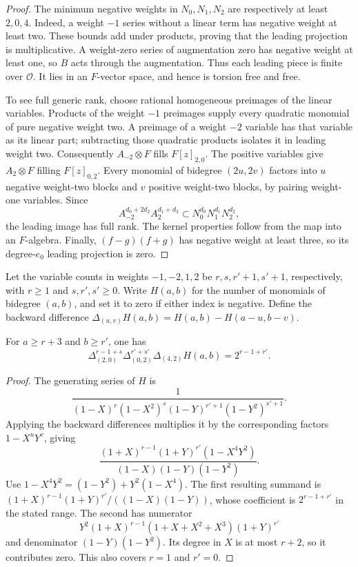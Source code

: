 \begin{proof}
The minimum negative weights in $N_0,N_1,N_2$ are respectively at least
$2,0,4$. Indeed, a weight $-1$ series without a linear term has negative
weight at least two. These bounds add under products, proving that the
leading projection is multiplicative. A weight-zero series of
augmentation zero has negative weight at least one, so $B$ acts through
the augmentation. Thus each leading piece is finite over $\mathcal O$.
It lies in an $F$-vector space, and hence is torsion free and free.

To see full generic rank, choose rational homogeneous preimages of the
linear variables. Products of the weight $-1$ preimages supply every
quadratic monomial of pure negative weight two. A preimage of a weight
$-2$ variable has that variable as its linear part; subtracting those
quadratic products isolates it in leading weight two. Consequently
$A_{-2}\otimes F$ fills $F[z]_{2,0}$. The positive variables give
$A_2\otimes F$ filling $F[z]_{0,2}$. Every monomial of bidegree $(2u,2v)$
factors into $u$ negative weight-two blocks and $v$ positive weight-two
blocks, by pairing weight-one variables. Since
\[
 A_{-2}^{d_0+2d_2}A_2^{d_1+d_2}
 \subset N_0^{d_0}N_1^{d_1}N_2^{d_2},
\]
the leading image has full rank. The kernel properties follow from the
map into an $F$-algebra. Finally, $(f-g)(f+g)$ has negative weight at
least three, so its degree-$e_0$ leading projection is zero.
\end{proof}

Let the variable counts in weights $-1,-2,1,2$ be
$r,s,r'+1,s'+1$, respectively, with $r\ge1$ and $s,r',s'\ge0$.
Write $H(a,b)$ for the number of monomials of bidegree $(a,b)$, and set
it to zero if either index is negative. Define the backward difference
$\Delta_{(u,v)}H(a,b)=H(a,b)-H(a-u,b-v)$.

\begin{lemma}
\label{lem:selmer-mixed-count}
For $a\ge r+3$ and $b\ge r'$, one has
\[
 \Delta_{(2,0)}^{r-1+s}\Delta_{(0,2)}^{r'+s'}
 \Delta_{(4,2)}H(a,b)=2^{r-1+r'}.
\]
\end{lemma}

\begin{proof}
The generating series of $H$ is
\[
 \frac1{(1-X)^r(1-X^2)^s(1-Y)^{r'+1}(1-Y^2)^{s'+1}}.
\]
Applying the backward differences multiplies it by the corresponding
factors $1-X^uY^v$, giving
\[
 \frac{(1+X)^{r-1}(1+Y)^{r'}(1-X^4Y^2)}
      {(1-X)(1-Y)(1-Y^2)}.
\]
Use $1-X^4Y^2=(1-Y^2)+Y^2(1-X^4)$. The first resulting summand is
$(1+X)^{r-1}(1+Y)^{r'}/((1-X)(1-Y))$, whose coefficient is
$2^{r-1+r'}$ in the stated range. The second has numerator
\[
 Y^2(1+X)^{r-1}(1+X+X^2+X^3)(1+Y)^{r'}
\]
and denominator $(1-Y)(1-Y^2)$. Its degree in $X$ is at most $r+2$,
so it contributes zero. This also covers $r=1$ and $r'=0$.
\end{proof}

